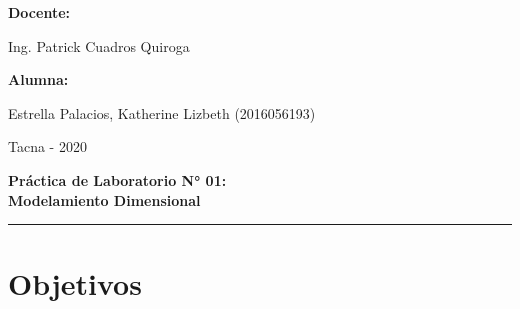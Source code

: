 \documentclass[12pt,letterpaper]{article}
\begin{document}
\begin{titlepage}
\begin{center}
	\vspace*{0.3in}
	\begin{Large}
	\textbf{Docente:} \\
	\end{Large}
	
	\vspace*{0.1in}
	\begin{large}
	 Ing. Patrick Cuadros Quiroga\\
	\end{large}
	
	\vspace*{0.2in}
	\vspace*{0.1in}
	\begin{large}
	\textbf{Alumna:} \\
	\begin{flushleft}
	Estrella Palacios, Katherine Lizbeth	\hfill	(2016056193) 
	\end{flushleft}
	\end{large}

	\vspace*{0.5in}
	\begin{large}
	 Tacna - 2020\\
	\end{large}

	\end{center}

\end{titlepage}


\tableofcontents %
\thispagestyle{empty} %
\newpage
\setcounter{page}{1} %

\begin{center}
\begin{LARGE}
	\textbf{Práctica de Laboratorio N° 01: \\ Modelamiento Dimensional} \\ 
\end{LARGE}
\rule{110mm}{0.1mm}
\end{center}




\section{Objetivos}
\end{document}
